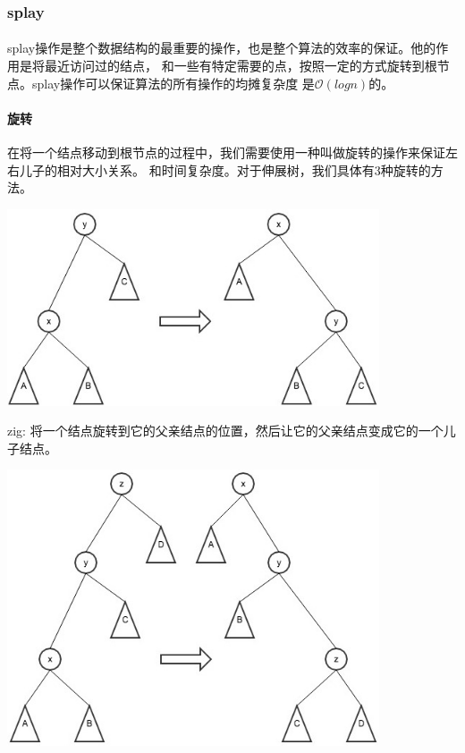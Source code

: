 \documentclass{article}
\begin{document}
	\subsubsection{splay}
		\paragraph{}
			splay操作是整个数据结构的最重要的操作，也是整个算法的效率的保证。他的作用是将最近访问过的结点，
			和一些有特定需要的点，按照一定的方式旋转到根节点。splay操作可以保证算法的所有操作的均摊复杂度
			是$\mathcal{O}(logn)$的。
		\paragraph{旋转}
			在将一个结点移动到根节点的过程中，我们需要使用一种叫做旋转的操作来保证左右儿子的相对大小关系。
			和时间复杂度。对于伸展树，我们具体有3种旋转的方法。
			\begin{center}
			\includegraphics[width = 11cm]{zig.jpg}\\
			\end{center}
			zig: 将一个结点旋转到它的父亲结点的位置，然后让它的父亲结点变成它的一个儿子结点。
			\begin{center}
			\includegraphics[width = 11cm]{zig-zig.jpg}\\
			\end{center}
\end{document}
